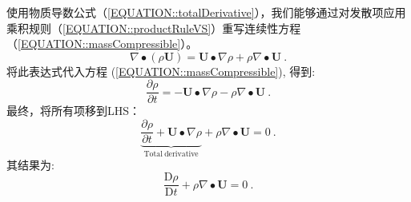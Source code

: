\documentclass[LBMDerivation.tex]{subfiles}
\begin{document}
 使用物质导数公式（\ref{EQUATION::totalDerivative}），我们能够通过对发散项应用乘积规则（\ref{EQUATION::productRuleVS}）重写连续性方程（\ref{EQUATION::massCompressible}）。
%
%
\begin{equation}
  \nabla \bullet \left(\rho \textbf{U}\right)
=
  \textbf{U} \bullet \nabla \rho + \rho \nabla \bullet \textbf{U} ~.
\end{equation}
%
%
	将此表达式代入方程
    (\ref{EQUATION::massCompressible}), 得到:
%
%
\begin{equation}
 \frac{\partial \rho}{\partial t}
 =
 -\textbf{U} \bullet \nabla \rho - \rho \nabla \bullet \textbf{U} ~.
\end{equation}
%
%
	最终，将所有项移到LHS：
%
%
\begin{equation}
 \underbrace{\frac{\partial \rho}{\partial t}
+
 \textbf{U} \bullet \nabla \rho}_{\mathrm{Total~derivative}}
+
 \rho \nabla \bullet \textbf{U}
 =
0 ~.
\end{equation}
%
%
其结果为:
%
%
\begin{equation}
 \frac{\mathrm{D} \rho}{\mathrm{D} t}
+
 \rho \nabla \bullet \textbf{U}
 =
0 ~.
\end{equation}
%
%



\end{document}
